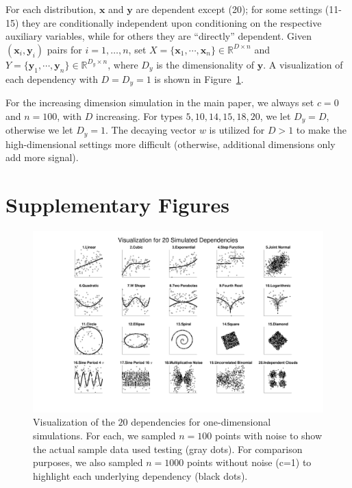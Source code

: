 \documentclass[11pt]{article}
\providecommand{\mb}[1]{\boldsymbol{#1}}
\newcommand{\Real}{\mathbb{R}}
\newcommand{\mby}{\ensuremath{\mb{y}}}
\begin{document}
For each distribution, $\mb{x}$ and $\mb{y}$ are dependent except  (20); for some settings (11-15) they are conditionally independent upon conditioning on the respective auxiliary variables, while for others they are
 ``directly'' dependent. 
 Given $(\mb{x}_{i},\mb{y}_{i})$ pairs for $i=1,\ldots,n$, set $X=\{\mb{x}_{1},\cdots, \mb{x}_{n}\} \in \Real^{D \times n}$ and $Y=\{\mb{y}_{1},\cdots, \mb{y}_{n}\} \in \Real^{D_y \times n}$, where $D_y$ is the dimensionality of \mby. A visualization of each dependency with $D=D_y=1$ is shown in Figure~\ref{f:dependencies}.


For the increasing dimension simulation in the main paper, we always set $c=0$ and $n=100$, with $D$ increasing.  For types  $5,10,14,15,18,20$, we let $D_y=D$, otherwise we let $D_y=1$. 
The decaying vector $w$ is utilized for $D>1$ to make the high-dimensional settings more difficult (otherwise, additional dimensions only add more signal).


\section{Supplementary Figures}
\label{appen:figs}





\begin{figure}[htbp]
\includegraphics[trim={5cm 0 3.5cm 0},clip, width=1.0\textwidth]{Figures/FigSimVisual}
\caption{Visualization of the $20$ dependencies for one-dimensional simulations. For each, we sampled $n=100$ points with noise to show the actual sample data used testing (gray dots). For comparison purposes, we also sampled $n=1000$ points without noise (c=1) to highlight each underlying dependency (black dots).
}
\label{f:dependencies}
\end{figure}
\end{document}
